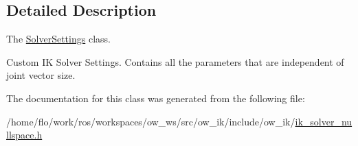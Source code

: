 \subsection{Detailed Description}
The \hyperlink{classow__ik_1_1SolverSettings}{Solver\+Settings} class. 

Custom IK Solver Settings. Contains all the parameters that are independent of joint vector size. 

The documentation for this class was generated from the following file\+:\begin{DoxyCompactItemize}
\item 
/home/flo/work/ros/workspaces/ow\+\_\+ws/src/ow\+\_\+ik/include/ow\+\_\+ik/\hyperlink{ik__solver__nullspace_8h}{ik\+\_\+solver\+\_\+nullspace.\+h}\end{DoxyCompactItemize}

